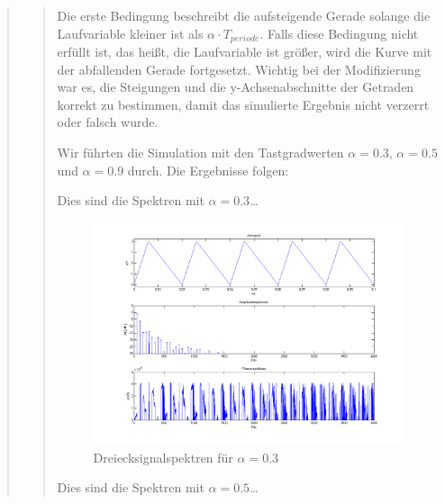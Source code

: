 \begin{quote}
\begin{quote}
		\vspace{1em}
		
		Die erste Bedingung beschreibt die aufsteigende Gerade solange die
		Laufvariable kleiner ist als $\alpha \cdot T_{periode}$. Falls diese Bedingung
		nicht erfüllt ist, das heißt, die Laufvariable ist größer, wird die Kurve mit
		der abfallenden Gerade fortgesetzt. Wichtig bei der Modifizierung war es, die Steigungen 
		und die y-Achsenabschnitte der Getraden korrekt zu bestimmen, damit das
		simulierte Ergebnis nicht verzerrt oder falsch wurde.
		
		Wir führten die Simulation mit den Tastgradwerten $\alpha = 0.3$, $\alpha = 0.5$
		und $\alpha = 0.9$ durch. Die Ergebnisse folgen:
			
		Dies sind die Spektren mit $\alpha = 0.3$\ldots
			
		\begin{center}
	    
	           \begin{figure}[H]
    			\centering
    				\includegraphics[scale=0.5]{drei_alpha3.png}
    			\caption{Dreiecksignalspektren für $\alpha = 0.3$}
    			\end{figure}		
		
		\end{center}
		
		
		
		\vspace{1em}
		
		Dies sind die Spektren mit $\alpha = 0.5$\ldots
		
		\begin{center}
	    

\end{center}
\end{quote}
\end{quote}
